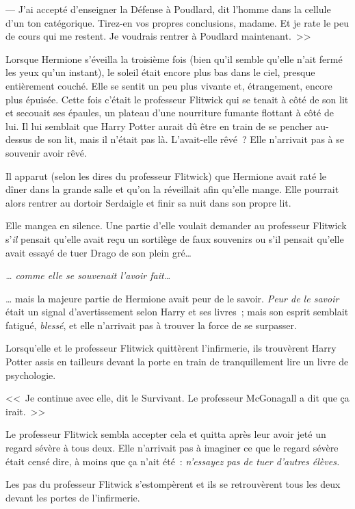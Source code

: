--- J'ai accepté d'enseigner la Défense à Poudlard, dit l'homme dans la cellule d'un ton catégorique. Tirez-en vos propres conclusions, madame. Et je rate le peu de cours qui me restent. Je voudrais rentrer à Poudlard maintenant.~>>

\later

Lorsque Hermione s'éveilla la troisième fois (bien qu'il semble qu'elle n'ait fermé les yeux qu'un instant), le soleil était encore plus bas dans le ciel, presque entièrement couché. Elle se sentit un peu plus vivante et, étrangement, encore plus épuisée. Cette fois c'était le professeur Flitwick qui se tenait à côté de son lit et secouait ses épaules, un plateau d'une nourriture fumante flottant à côté de lui. Il lui semblait que Harry Potter aurait dû être en train de se pencher au-dessus de son lit, mais il n'était pas là. L'avait-elle rêvé~? Elle n'arrivait pas à se souvenir avoir rêvé.

Il apparut (selon les dires du professeur Flitwick) que Hermione avait raté le dîner dans la grande salle et qu'on la réveillait afin qu'elle mange. Elle pourrait alors rentrer au dortoir Serdaigle et finir sa nuit dans son propre lit.

Elle mangea en silence. Une partie d'elle voulait demander au professeur Flitwick s'\emph{il} pensait qu'elle avait reçu un sortilège de faux souvenirs ou s'il pensait qu'elle avait essayé de tuer Drago de son plein gré…

\emph{… comme elle se souvenait l'avoir fait…}

… mais la majeure partie de Hermione avait peur de le savoir. \emph{Peur de le savoir} était un signal d'avertissement selon Harry et ses livres~; mais son esprit semblait fatigué, \emph{blessé}, et elle n'arrivait pas à trouver la force de se surpasser.

Lorsqu'elle et le professeur Flitwick quittèrent l'infirmerie, ils trouvèrent Harry Potter assis en tailleurs devant la porte en train de tranquillement lire un livre de psychologie.

<<~Je continue avec elle, dit le Survivant. Le professeur McGonagall a dit que ça irait.~>>

Le professeur Flitwick sembla accepter cela et quitta après leur avoir jeté un regard sévère à tous deux. Elle n'arrivait pas à imaginer ce que le regard sévère était censé dire, à moins que ça n'ait été~: \emph{n'essayez pas de tuer d'autres élèves.}

Les pas du professeur Flitwick s'estompèrent et ils se retrouvèrent tous les deux devant les portes de l'infirmerie.


